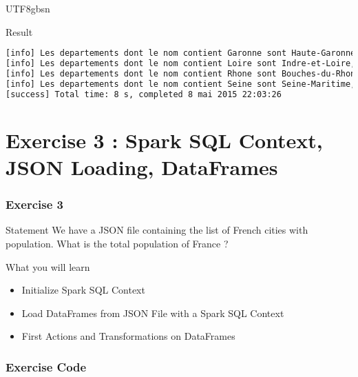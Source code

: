 \documentclass[slidetop,9pt,utf8]{beamer}
\begin{document}
\begin{CJK}{UTF8}{gbsn}
\begin{frame}[fragile]
  \begin{block}{Result}
    \begin{lstlisting}[language=bash, style=terminal]
[info] Les departements dont le nom contient Garonne sont Haute-Garonne, Lot-et-Garonne, Tarn-et-Garonne
[info] Les departements dont le nom contient Loire sont Indre-et-Loire, Loire, Haute-Loire, Loire-Atlantique, Loiret, Maine-et-Loire, Saone-et-Loire
[info] Les departements dont le nom contient Rhone sont Bouches-du-Rhone, Rhone
[info] Les departements dont le nom contient Seine sont Seine-Maritime, Seine-et-Marne, Hauts-de-Seine, Seine-Saint-Denis
[success] Total time: 8 s, completed 8 mai 2015 22:03:26
    \end{lstlisting}
  \end{block}

\end{frame}

\section{Exercise 3 : Spark SQL Context, JSON Loading, DataFrames}

\begin{frame}
  \frametitle{Exercise 3}

  \begin{block}{Statement}
    We have a JSON file containing the list of French cities with population. What is the total population of France ?
  \end{block}

  \begin{block}{What you will learn}
    \begin{itemize}
      \item Initialize Spark SQL Context
      \item Load DataFrames from JSON File with a Spark SQL Context
      \item First Actions and Transformations on DataFrames
    \end{itemize}
  \end{block}

\end{frame}

\begin{frame}
  \frametitle{Exercise Code}

  


\end{frame}
\end{CJK}
\end{document}
